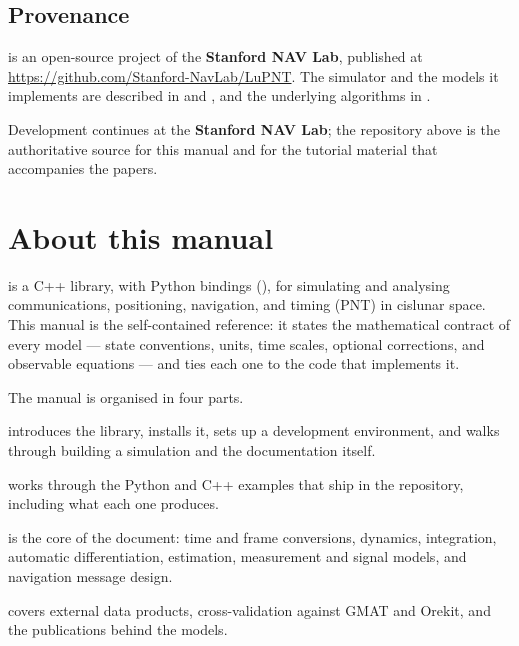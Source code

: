 \documentclass[11pt,twoside,openright]{book}
\begin{document}
\vfill

\section*{Provenance}

\lupnt{} is an open-source project of the \textbf{Stanford NAV Lab},
published at
\url{https://github.com/Stanford-NavLab/LuPNT}. The simulator and the models it
implements are described in \citet{iiyama2023lupnt} and
\citet{casadesus2025lupnt}, and the underlying algorithms in
\citet{iiyama2026thesis}.

Development continues at the \textbf{Stanford NAV Lab}; the repository above is
the authoritative source for this manual and for the tutorial material that
accompanies the papers.

\clearpage

\chapter*{About this manual}

\lupnt{} is a C++ library, with Python bindings (\pylupnt{}), for simulating
and analysing communications, positioning, navigation, and timing (PNT) in
cislunar space. This manual is the self-contained reference: it states the
mathematical contract of every model --- state conventions, units, time
scales, optional corrections, and observable equations --- and ties each one to
the code that implements it.

The manual is organised in four parts.
\begin{description}[leftmargin=1.6cm,style=nextline,font=\normalfont\itshape]
  \item[Part~\ref{part:overview}, Overview and Setup] introduces the library,
    installs it, sets up a development environment, and walks through building
    a simulation and the documentation itself.
  \item[Part~\ref{part:tutorials}, Tutorials] works through the Python and C++
    examples that ship in the repository, including what each one produces.
  \item[Part~\ref{part:math}, Mathematical Specifications] is the core of the
    document: time and frame conversions, dynamics, integration, automatic
    differentiation, estimation, measurement and signal models, and navigation
    message design.
  \item[Part~\ref{part:verification}, Verification, Data, and References]
    covers external data products, cross-validation against GMAT and Orekit,
    and the publications behind the models.
\end{description}
\end{document}
